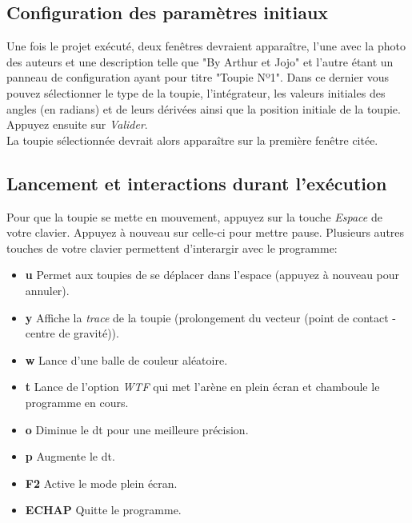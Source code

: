 \documentclass[a4paper]{article}%
\begin{document}
	\subsection {Configuration des paramètres initiaux}
		Une fois le projet exécuté, deux fenêtres devraient apparaître, l'une avec la photo des auteurs et une description telle que "By Arthur et Jojo" et l'autre étant un panneau de configuration ayant pour titre "Toupie Nº1". Dans ce dernier vous pouvez sélectionner le type de la toupie, l'intégrateur, les valeurs initiales des angles (en radians) et de leurs dérivées ainsi que la position initiale de la toupie. Appuyez ensuite sur \emph{Valider}. \\
	
	La toupie sélectionnée devrait alors apparaître sur la première fenêtre citée. 
	\subsection {Lancement et interactions durant l'exécution}
		Pour que la toupie se mette en mouvement, appuyez sur  la touche \emph{Espace} de votre clavier. Appuyez à nouveau sur celle-ci pour mettre pause. Plusieurs autres touches de votre clavier permettent d'interargir avec le programme: 
		\begin {itemize} 
			\item[\textbf{u}] Permet aux toupies de se déplacer dans l'espace (appuyez à nouveau pour annuler).
			\item[\textbf{y}] Affiche la \emph{trace} de la toupie (prolongement du vecteur (point de contact - centre de gravité)).
			\item[\textbf{w}] Lance d'une balle de couleur aléatoire.
			\item[\textbf{t}] Lance de l'option \emph {WTF} qui met l'arène en plein écran et chamboule le programme en cours.
			\item[\textbf{o}] Diminue le dt pour une meilleure précision.
			\item[\textbf{p}] Augmente le dt.
			\item[\textbf{F2}] Active le mode plein écran.
			\item[\textbf{ECHAP}] Quitte le programme.
			
		\end {itemize}
\end{document}
